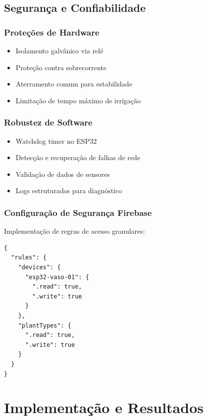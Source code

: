 \documentclass[twoside,english,brazilian]{UNISINOSmonografia}
\begin{document}
\section{Segurança e Confiabilidade}

\subsection{Proteções de Hardware}
\begin{itemize}
    \item Isolamento galvânico via relé
    \item Proteção contra sobrecorrente
    \item Aterramento comum para estabilidade
    \item Limitação de tempo máximo de irrigação
\end{itemize}

\subsection{Robustez de Software}
\begin{itemize}
    \item Watchdog timer no ESP32
    \item Detecção e recuperação de falhas de rede
    \item Validação de dados de sensores
    \item Logs estruturados para diagnóstico
\end{itemize}

\subsection{Configuração de Segurança Firebase}
Implementação de regras de acesso granulares:
\begin{verbatim}
{
  "rules": {
    "devices": {
      "esp32-vaso-01": {
        ".read": true,
        ".write": true
      }
    },
    "plantTypes": {
      ".read": true,
      ".write": true
    }
  }
}
\end{verbatim}

\chapter{Implementação e Resultados}
\end{document}
